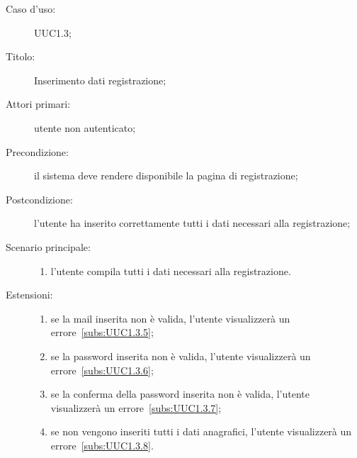 \documentclass[../../../analisi-dei-requisiti.tex]{subfiles}
\begin{document}
\begin{description}
  \item[Caso d'uso:] UUC1.3;
  \item[Titolo:] Inserimento dati registrazione;
  \item[Attori primari:] utente non autenticato;
  \item[Precondizione:] il sistema deve rendere disponibile la pagina di registrazione;
  \item[Postcondizione:] l'utente ha inserito correttamente tutti i dati necessari alla registrazione;
  \item[Scenario principale:]
        \begin{enumerate}
          \item l'utente compila tutti i dati necessari alla registrazione.
        \end{enumerate}
  \item[Estensioni:]
        \begin{enumerate}
          \item se la mail inserita non è valida, l'utente visualizzerà un errore~\ref{subs:UUC1.3.5};
          \item se la password inserita non è valida, l'utente visualizzerà un errore~\ref{subs:UUC1.3.6};
          \item se la conferma della password inserita non è valida, l'utente visualizzerà un errore~\ref{subs:UUC1.3.7};
          \item se non vengono inseriti tutti i dati anagrafici, l'utente visualizzerà un errore~\ref{subs:UUC1.3.8}.
        \end{enumerate}
\end{description}
\end{document}
